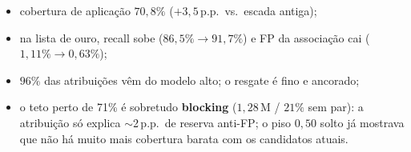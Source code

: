 \documentclass[11pt,a4paper]{article}
\begin{document}
\begin{itemize}
  \item cobertura de aplicação $70{,}8\%$ ($+3{,}5$\,p.p.\ vs.\ escada antiga);
  \item na lista de ouro, recall sobe ($86{,}5\% \to 91{,}7\%$) e FP da
        associação cai ($1{,}11\% \to 0{,}63\%$);
  \item $96\%$ das atribuições vêm do modelo alto; o resgate é fino e
        ancorado;
  \item o teto perto de 71\% é sobretudo \textbf{blocking}
        ($1{,}28$\,M / $21\%$ sem par): a atribuição só explica $\sim$2\,p.p.\
        de reserva anti-FP; o piso $0{,}50$ solto já mostrava que não há
        muito mais cobertura barata com os candidatos atuais.
\end{itemize}
\end{document}
